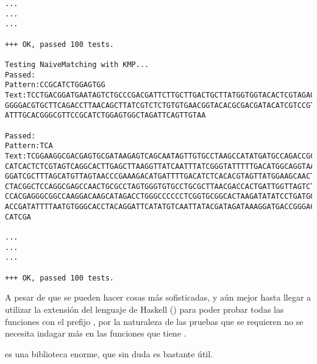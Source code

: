 \begin{verbatim}
...
...
...

+++ OK, passed 100 tests.

Testing NaiveMatching with KMP...
Passed:
Pattern:CCGCATCTGGAGTGG
Text:TCCTGACGGATGAATAGTCTGCCCGACGATTCTTGCTTGACTGCTTATGGTGGTACACTCGTAGAGGGT
GGGGACGTGCTTCAGACCTTAACAGCTTATCGTCTCTGTGTGAACGGTACACGCGACGATACATCGTCCGTAGG
ATTTGCACGGGCGTTCCGCATCTGGAGTGGCTAGATTCAGTTGTAA

Passed:
Pattern:TCA
Text:TCGGAAGGCGACGAGTGCGATAAGAGTCAGCAATAGTTGTGCCTAAGCCATATGATGCCAGACCGCCGT
CATCACTCTCGTAGTCAGGCACTTGAGCTTAAGGTTATCAATTTATCGGGTATTTTTGACATGGCAGGTAAGGG
GGATCGCTTTAGCATGTTAGTAACCCGAAAGACATGATTTTGACATCTCACACGTAGTTATGGAAGCAACTGCC
CTACGGCTCCAGGCGAGCCAACTGCGCCTAGTGGGTGTGCCTGCGCTTAACGACCACTGATTGGTTAGTCTGAT
CCACGAGGGCGGCCAAGGACAAGCATAGACCTGGGCCCCCCTCGGTGCGGCACTAAGATATATCCTGATGGACC
ACCGATATTTTAATGTGGGCACCTACAGGATTCATATGTCAATTATACGATAGATAAAGGATGACCGGGACACA
CATCGA

...
...
...

+++ OK, passed 100 tests.
\end{verbatim}

A pesar de que se pueden hacer cosas más sofisticadas, y aún mejor hasta llegar a utilizar
la extensión del lenguaje de Haskell () para poder probar
todas las funciones con el prefijo , por la naturaleza de las pruebas que se
requieren no se necesita indagar más en las funciones que tiene \QuickCheck.

\QuickCheck es una biblioteca enorme, que sin duda es bastante útil.
